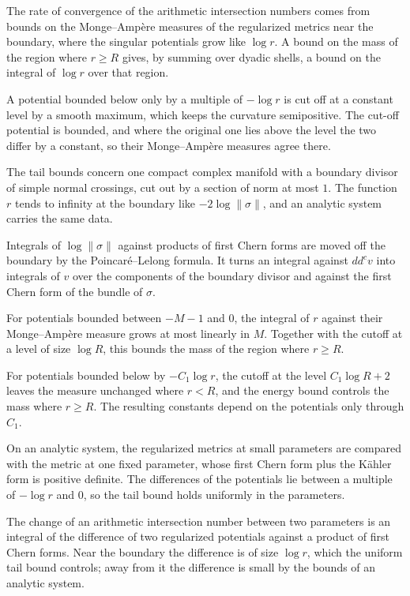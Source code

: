 The rate of convergence of the arithmetic intersection numbers comes from bounds on the
Monge--Amp\`ere measures of the regularized metrics near the boundary, where the singular potentials
grow like $\log r$. A bound on the mass of the region where $r\ge R$ gives, by summing over dyadic
shells, a bound on the integral of $\log r$ over that region.

A potential bounded below only by a multiple of $-\log r$ is cut off at a constant level by a smooth
maximum, which keeps the curvature semipositive. The cut-off potential is bounded, and where the
original one lies above the level the two differ by a constant, so their Monge--Amp\`ere measures
agree there.

The tail bounds concern one compact complex manifold with a boundary divisor of simple normal
crossings, cut out by a section of norm at most $1$. The function $r$ tends to infinity at the
boundary like $-2\log\|\sigma\|$, and an analytic system carries the same data.

Integrals of $\log\|\sigma\|$ against products of first Chern forms are moved off the boundary by the
Poincar\'e--Lelong formula. It turns an integral against $dd^cv$ into integrals of $v$ over the
components of the boundary divisor and against the first Chern form of the bundle of $\sigma$.

For potentials bounded between $-M-1$ and $0$, the integral of $r$ against their Monge--Amp\`ere
measure grows at most linearly in $M$. Together with the cutoff at a level of size $\log R$, this
bounds the mass of the region where $r\ge R$.

For potentials bounded below by $-C_1\log r$, the cutoff at the level $C_1\log R+2$ leaves the
measure unchanged where $r<R$, and the energy bound controls the mass where $r\ge R$. The resulting
constants depend on the potentials only through $C_1$.

On an analytic system, the regularized metrics at small parameters are compared with the metric at
one fixed parameter, whose first Chern form plus the K\"ahler form is positive definite. The
differences of the potentials lie between a multiple of $-\log r$ and $0$, so the tail bound holds
uniformly in the parameters.

The change of an arithmetic intersection number between two parameters is an integral of the
difference of two regularized potentials against a product of first Chern forms. Near the boundary
the difference is of size $\log r$, which the uniform tail bound controls; away from it the
difference is small by the bounds of an analytic system.

